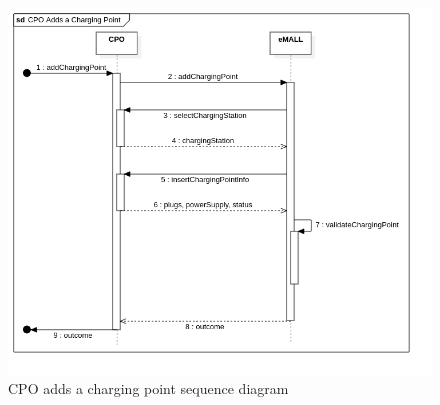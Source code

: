 \begin{center}
    \begin{figure} [H]
        \begin{center}
            \includegraphics[width=0.9\linewidth]{Images/SequenceDiagrams/cpo_adds_a_charging_point}
            \caption{CPO adds a charging point sequence diagram}
            \label{fig: cpo_adds_point_seq_diag}
        \end{center}
    \end{figure}
\end{center}

